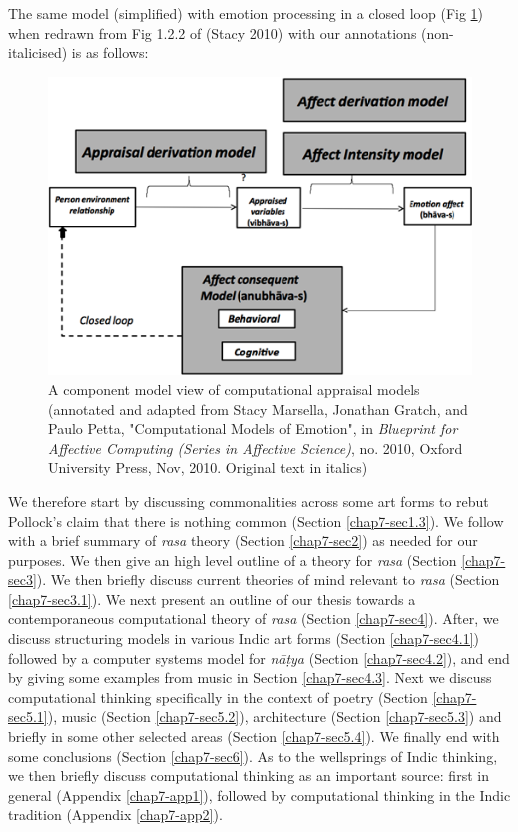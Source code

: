 The same model (simplified) with emotion processing in a closed loop (Fig \ref{chap7-fig2}) when redrawn from Fig 1.2.2 of (Stacy 2010) with our annotations (non-italicised) is as follows:

\begin{figure}[H]
\centering
\includegraphics{figures/4.eps}
\caption{A component model view of computational appraisal models (annotated and adapted from Stacy Marsella, Jonathan Gratch, and Paulo Petta, "Computational Models of Emotion", in \textsl{Blueprint for Affective Computing (Series in Affective Science)}, no. 2010, Oxford University Press, Nov, 2010. Original text in italics)}\label{chap7-fig2}
\end{figure}

We therefore start by discussing commonalities across some art forms to rebut Pollock’s claim that there is nothing common (Section \ref{chap7-sec1.3}). We follow with a brief summary of \textsl{rasa} theory (Section \ref{chap7-sec2}) as needed for our purposes. We then give an high level outline of a theory for \textsl{rasa} (Section \ref{chap7-sec3}). We then briefly discuss current theories of mind relevant to \textsl{rasa} (Section \ref{chap7-sec3.1}). We next present an outline of our thesis towards a contemporaneous computational theory of \textsl{rasa} (Section \ref{chap7-sec4}). After, we discuss structuring models in various Indic art forms (Section \ref{chap7-sec4.1}) followed by a computer systems model for \textsl{nāṭya} (Section \ref{chap7-sec4.2}), and end by giving some examples from music in Section \ref{chap7-sec4.3}. Next we discuss computational thinking specifically in the context of poetry (Section \ref{chap7-sec5.1}), music (Section \ref{chap7-sec5.2}), architecture (Section \ref{chap7-sec5.3}) and briefly in some other selected areas (Section \ref{chap7-sec5.4}). We finally end with some conclusions (Section \ref{chap7-sec6}). As to the wellsprings of Indic thinking, we then briefly discuss computational thinking as an important source: first in general (Appendix \ref{chap7-app1}), followed by computational thinking in the Indic tradition (Appendix \ref{chap7-app2}). 

